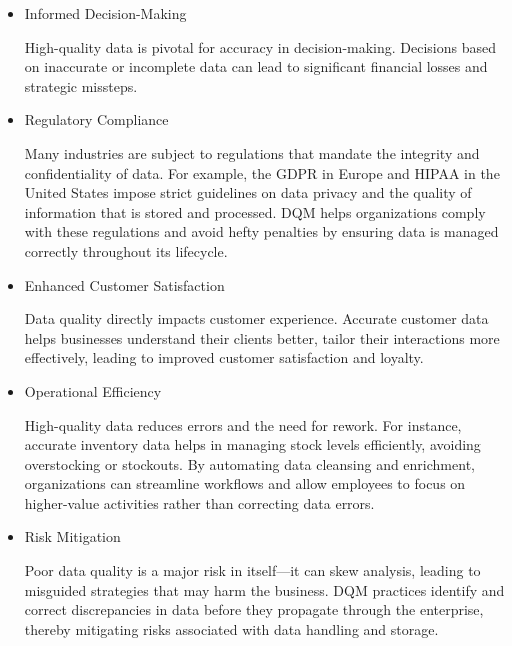 \begin{itemize}
    \item   Informed Decision-Making
    
    High-quality data is pivotal for accuracy in decision-making. Decisions based on inaccurate or incomplete data can lead to significant financial losses and strategic missteps.

    \item   Regulatory Compliance
    
    Many industries are subject to regulations that mandate the integrity and confidentiality of data. For example, the GDPR in Europe and HIPAA in the United States impose strict guidelines on data privacy and the quality of information that is stored and processed.
        DQM helps organizations comply with these regulations and avoid hefty penalties by ensuring data is managed correctly throughout its lifecycle.

    \item   Enhanced Customer Satisfaction

    Data quality directly impacts customer experience. Accurate customer data helps businesses understand their clients better, tailor their interactions more effectively, leading to improved customer satisfaction and loyalty.

    \item Operational Efficiency
    
    High-quality data reduces errors and the need for rework. For instance, accurate inventory data helps in managing stock levels efficiently, avoiding overstocking or stockouts.
    By automating data cleansing and enrichment, organizations can streamline workflows and allow employees to focus on higher-value activities rather than correcting data errors.    

    \item     Risk Mitigation

    Poor data quality is a major risk in itself—it can skew analysis, leading to misguided strategies that may harm the business.
    DQM practices identify and correct discrepancies in data before they propagate through the enterprise, thereby mitigating risks associated with data handling and storage.

\end{itemize}




